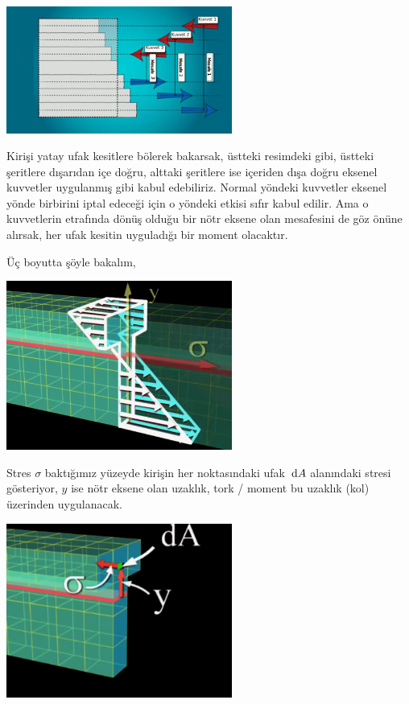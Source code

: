 \documentclass[12pt,fleqn]{article}\usepackage{../../common}
\begin{document}
\includegraphics[width=20em]{phy_020_strs_01_09.jpg}

Kirişi yatay ufak kesitlere bölerek bakarsak, üstteki resimdeki gibi, üstteki
şeritlere dışarıdan içe doğru, alttaki şeritlere ise içeriden dışa doğru eksenel
kuvvetler uygulanmış gibi kabul edebiliriz. Normal yöndeki kuvvetler eksenel
yönde birbirini iptal edeceği için o yöndeki etkisi sıfır kabul edilir. Ama o
kuvvetlerin etrafında dönüş olduğu bir nötr eksene olan mesafesini de göz önüne
alırsak, her ufak kesitin uyguladığı bir moment olacaktır.

Üç boyutta şöyle bakalım,

\includegraphics[width=20em]{phy_020_strs_01_07.jpg}

Stres $\sigma$ baktığımız yüzeyde kirişin her noktasındaki ufak $\,\mathrm{d} A$
alanındaki stresi gösteriyor, $y$ ise nötr eksene olan uzaklık, tork / moment
bu uzaklık (kol) üzerinden uygulanacak.

\includegraphics[width=20em]{phy_020_strs_01_08.jpg}
\end{document}
